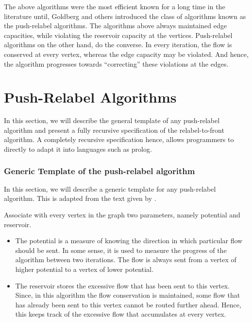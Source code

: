 \documentclass[BTech]{iitmdiss}
\begin{document}
	    The above algorithms were the most efficient known for a long time in the literature until, Goldberg and others introduced the 
	    class of algorithms known as the push-relabel algorithms. The algorithms above always maintained edge capacities, while violating the 
	    reservoir capacity at the vertices. Push-relabel algorithms on the other hand, do the converse. In every iteration, the flow is 
	    conserved at every vertex, whereas the edge capacity may be violated. And hence, the algorithm progresses towards ``correcting'' these violations
	    at the edges. \\
	    
	   \section{Push-Relabel Algorithms}
	      In this section, we will describe the general template of any push-relabel algorithm and present a fully recursive specification
	      of the relabel-to-front algorithm. A completely recursive specification hence, allows programmers to directly to adapt it into languages
	      such as prolog. \\
	      
	      
	      \subsubsection{Generic Template of the push-relabel algorithm}
	      In this section, we will describe a generic template for any push-relabel algorithm. This is adapted from the text given by 
	      \cite{clrs}.
	      
	      Associate with every vertex in the graph two parameters, namely potential and reservoir.
	      \begin{itemize}
	       \item 
		  The potential is a measure of knowing the direction in which particular flow should be sent.
	      In some sense, it is used to measure the progress of the algorithm between two iterations.
	      The flow is always sent from a vertex of higher potential to a vertex of lower potential. \\
	      
	      \item
		  The reservoir stores the excessive flow that has been sent to this vertex. Since, in this algorithm the flow conservation is maintained,
		  some flow that has already been sent to this vertex cannot be routed further ahead. Hence, this keeps track of the excessive flow 
		  that accumulates at every vertex. \\
		  
		  
	      \end{itemize}
\end{document}
